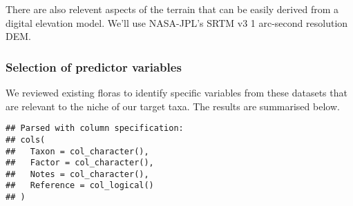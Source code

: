 \documentclass[]{article}
\begin{document}
There are also relevent aspects of the terrain that can be easily
derived from a digital elevation model. We'll use NASA-JPL's SRTM v3 1
arc-second resolution DEM.

\hypertarget{selection-of-predictor-variables}{%
\subsubsection{Selection of predictor
variables}\label{selection-of-predictor-variables}}

We reviewed existing floras to identify specific variables from these
datasets that are relevant to the niche of our target taxa. The results
are summarised below.

\begin{verbatim}
## Parsed with column specification:
## cols(
##   Taxon = col_character(),
##   Factor = col_character(),
##   Notes = col_character(),
##   Reference = col_logical()
## )
\end{verbatim}
\end{document}
